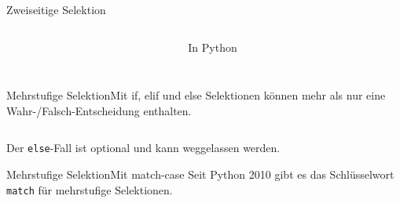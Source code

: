\documentclass[xelatex,aspectratio=169]{beamer}
\begin{document}
\begin{frame}{Zweiseitige Selektion}
\begin{columns}[t]
\begin{column}{.3\linewidth}
    \end{column}
    \begin{column}{.3\linewidth}
      \begin{block}{In Python}
        \inputminted{python}{src/algorithmus_zweiseitige_selektion.py}
      \end{block}

    \end{column}
  \end{columns}

\end{frame}

\begin{frame}{Mehrstufige Selektion}{Mit if, elif und else}
  Selektionen können mehr als nur eine Wahr-/Falsch-Entscheidung enthalten.

  \inputminted{python}{src/algorithmus_mehrstufige_selektion.py}

  Der \texttt{else}-Fall ist optional und kann weggelassen werden.
\end{frame}


\begin{frame}{Mehrstufige Selektion}{Mit match-case}
  Seit Python 2010 gibt es das Schlüsselwort \texttt{match} für mehrstufige Selektionen.

  \inputminted{python}{src/algorithmus_mehrstufige_selektion_match.py}

\end{frame}
\end{document}
